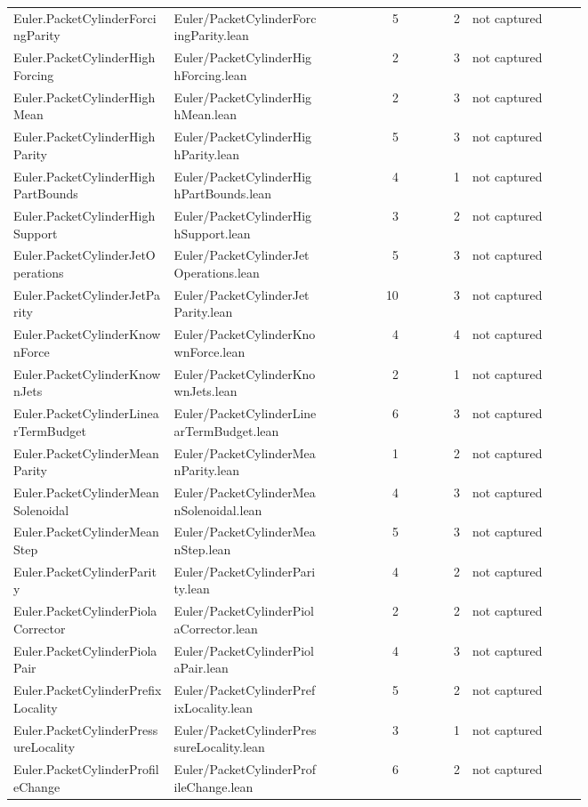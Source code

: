 \documentclass[10pt]{article}
\begin{document}
\begin{longtable}{p{0.28\linewidth}p{0.27\linewidth}r r p{0.20\linewidth}}
Euler.PacketCylinderForcingParity & Euler/PacketCylinderForcingParity.lean & 5 & 2 & not captured\\
Euler.PacketCylinderHighForcing & Euler/PacketCylinderHighForcing.lean & 2 & 3 & not captured\\
Euler.PacketCylinderHighMean & Euler/PacketCylinderHighMean.lean & 2 & 3 & not captured\\
Euler.PacketCylinderHighParity & Euler/PacketCylinderHighParity.lean & 5 & 3 & not captured\\
Euler.PacketCylinderHighPartBounds & Euler/PacketCylinderHighPartBounds.lean & 4 & 1 & not captured\\
Euler.PacketCylinderHighSupport & Euler/PacketCylinderHighSupport.lean & 3 & 2 & not captured\\
Euler.PacketCylinderJetOperations & Euler/PacketCylinderJetOperations.lean & 5 & 3 & not captured\\
Euler.PacketCylinderJetParity & Euler/PacketCylinderJetParity.lean & 10 & 3 & not captured\\
Euler.PacketCylinderKnownForce & Euler/PacketCylinderKnownForce.lean & 4 & 4 & not captured\\
Euler.PacketCylinderKnownJets & Euler/PacketCylinderKnownJets.lean & 2 & 1 & not captured\\
Euler.PacketCylinderLinearTermBudget & Euler/PacketCylinderLinearTermBudget.lean & 6 & 3 & not captured\\
Euler.PacketCylinderMeanParity & Euler/PacketCylinderMeanParity.lean & 1 & 2 & not captured\\
Euler.PacketCylinderMeanSolenoidal & Euler/PacketCylinderMeanSolenoidal.lean & 4 & 3 & not captured\\
Euler.PacketCylinderMeanStep & Euler/PacketCylinderMeanStep.lean & 5 & 3 & not captured\\
Euler.PacketCylinderParity & Euler/PacketCylinderParity.lean & 4 & 2 & not captured\\
Euler.PacketCylinderPiolaCorrector & Euler/PacketCylinderPiolaCorrector.lean & 2 & 2 & not captured\\
Euler.PacketCylinderPiolaPair & Euler/PacketCylinderPiolaPair.lean & 4 & 3 & not captured\\
Euler.PacketCylinderPrefixLocality & Euler/PacketCylinderPrefixLocality.lean & 5 & 2 & not captured\\
Euler.PacketCylinderPressureLocality & Euler/PacketCylinderPressureLocality.lean & 3 & 1 & not captured\\
Euler.PacketCylinderProfileChange & Euler/PacketCylinderProfileChange.lean & 6 & 2 & not captured\\

\end{longtable}
\end{document}

